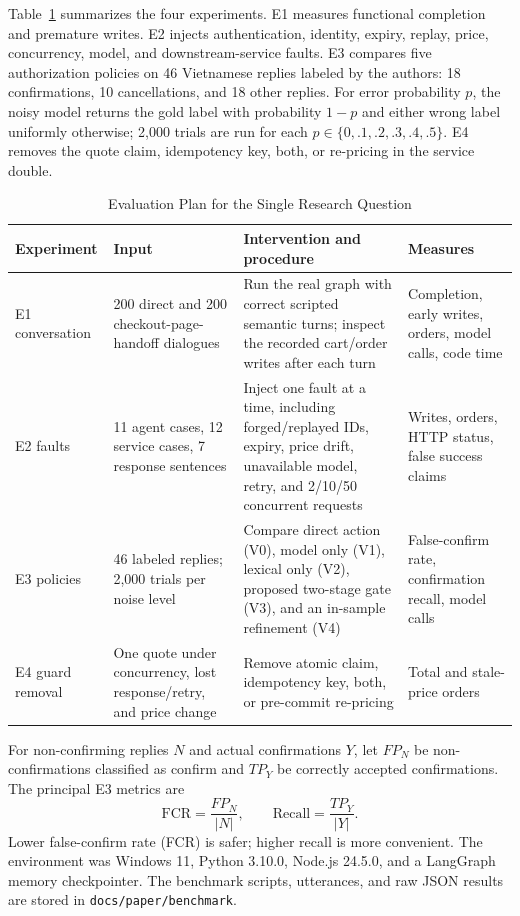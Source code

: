 \documentclass{IEEEtran}
\newcommand{\code}[1]{\texttt{\small #1}}
\begin{document}
Table~\ref{tab:experiments} summarizes the four experiments. E1 measures functional completion and premature writes. E2 injects authentication, identity, expiry, replay, price, concurrency, model, and downstream-service faults. E3 compares five authorization policies on 46 Vietnamese replies labeled by the authors: 18 confirmations, 10 cancellations, and 18 other replies. For error probability $p$, the noisy model returns the gold label with probability $1-p$ and either wrong label uniformly otherwise; 2,000 trials are run for each $p\in\{0,.1,.2,.3,.4,.5\}$. E4 removes the quote claim, idempotency key, both, or re-pricing in the service double.

\begin{table}[t]
\caption{Evaluation Plan for the Single Research Question}
\label{tab:experiments}
\centering
\footnotesize
\setlength{\tabcolsep}{4pt}
\begin{tabular}{@{}p{17mm}p{48mm}p{68mm}p{35mm}@{}}
\toprule
Experiment & Input & Intervention and procedure & Measures \\
\midrule
E1 conversation & 200 direct and 200 checkout-page-handoff dialogues & Run the real graph with correct scripted semantic turns; inspect the recorded cart/order writes after each turn & Completion, early writes, orders, model calls, code time \\
E2 faults & 11 agent cases, 12 service cases, 7 response sentences & Inject one fault at a time, including forged/replayed IDs, expiry, price drift, unavailable model, retry, and 2/10/50 concurrent requests & Writes, orders, HTTP status, false success claims \\
E3 policies & 46 labeled replies; 2,000 trials per noise level & Compare direct action (V0), model only (V1), lexical only (V2), proposed two-stage gate (V3), and an in-sample refinement (V4) & False-confirm rate, confirmation recall, model calls \\
E4 guard removal & One quote under concurrency, lost response/retry, and price change & Remove atomic claim, idempotency key, both, or pre-commit re-pricing & Total and stale-price orders \\
\bottomrule
\end{tabular}
\end{table}

For non-confirming replies $N$ and actual confirmations $Y$, let $FP_N$ be non-confirmations classified as confirm and $TP_Y$ be correctly accepted confirmations. The principal E3 metrics are
\begin{equation}
\mathrm{FCR}=\frac{FP_N}{|N|},\qquad
\mathrm{Recall}=\frac{TP_Y}{|Y|}.
\end{equation}
Lower false-confirm rate (FCR) is safer; higher recall is more convenient. The environment was Windows 11, Python 3.10.0, Node.js 24.5.0, and a LangGraph memory checkpointer. The benchmark scripts, utterances, and raw JSON results are stored in \code{docs/paper/benchmark}.
\end{document}

